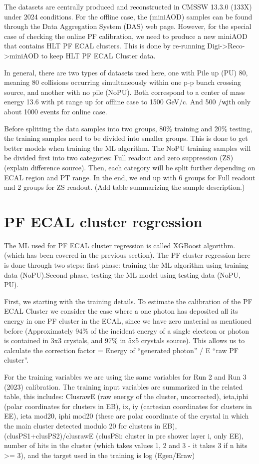 The datasets are centrally produced and reconstructed in CMSSW 13.3.0 (133X) under 2024 conditions. For the offline case, the (miniAOD) samples can be found through the Data Aggregation System (DAS) web page. However, for the special case of checking the online PF calibration, we need to produce a new miniAOD that contains HLT PF ECAL clusters. This is done by re-running Digi->Reco->miniAOD to keep HLT PF ECAL Cluster data.

In general, there are two types of datasets used here, one with Pile up (PU) 80, meaning 80 collisions occurring simultaneously within one p-p bunch crossing source, and another with no pile (NoPU). Both correspond to a center of mass energy 13.6 \TeV with pt range up for offline case to 1500 GeV/c. And 500 \GeV/\c with only about 1000 events for online case.     

Before splitting the data samples into two groups, 80\% training and 20\% testing, the training samples need to be divided into smaller groups. This is done to get better models when training the ML algorithm. The NoPU training samples will be divided first into two categories: Full readout and zero suppression (ZS) (explain difference source). Then, each category will be split further depending on ECAL region and PT range. In the end, we end up with 6 groups for Full readout and 2 groups for ZS readout. (Add table summarizing the sample description.) 




\section{PF ECAL cluster regression}
The ML used for PF ECAL cluster regression is called XGBoost algorithm. (which has been covered in the previous section). The PF cluster regression here is done through two steps: first phase: training the ML algorithm using training data (NoPU).Second phase, testing the ML model using testing data (NoPU, PU).

First, we starting with the training details. To estimate the calibration of the PF ECAL Cluster we consider the case where a one photon has deposited all its energy in one PF cluster in the ECAL, since we have zero material as mentioned before (Approximately 94\% of the incident energy of a single electron or photon is contained in 3x3 crystals, and 97\% in 5x5 crystals source).  
This allows us to calculate the correction factor = Energy of “generated photon” / E “raw PF cluster”.

For the training variables we are using the same variables for Run 2 and Run 3 (2023) calibration. The training input variables are summarized in the related table, this includes:  
ClusrawE (raw energy of the cluster, uncorrected), 
ieta,iphi (polar coordinates for clusters in EB), 
ix, iy (cartesian coordinates for clusters in EE), 
ieta mod20, iphi mod20 (these are polar coordinate of the crystal in which the main cluster detected modulo 20 for clusters in EB), 
(clusPS1+clusPS2)/clusrawE (clusPSi: cluster in pre shower layer i, only EE), 
 number of hits in the cluster (which takes values 1, 2 and 3 - it takes 3 if n hits >= 3), 
and the target used in the training is log (Egen/Eraw)  

